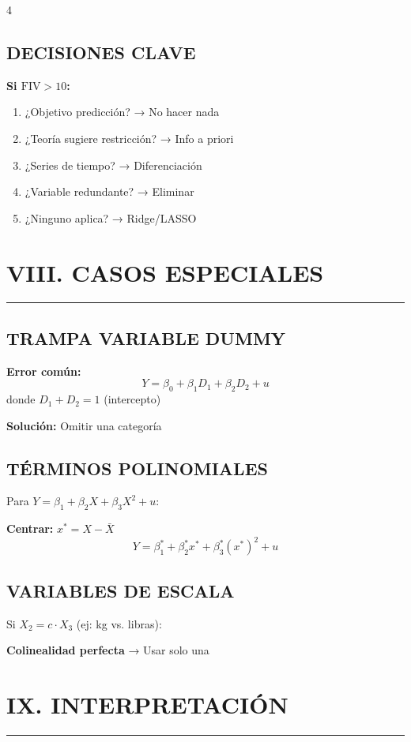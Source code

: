 \documentclass[6pt, landscape]{extarticle}
\newcommand{\sectionline}{%
  \nopagebreak\vspace{-4pt}\noindent\textcolor{GoldLeaf}{\rule{\linewidth}{1pt}}\par\vspace{2pt}%
}
\newcommand{\FIV}{\text{FIV}}
\begin{document}
\begin{multicols*}{4}
\subsection{DECISIONES CLAVE}

\textbf{Si $\FIV > 10$:}
\begin{enumerate}
    \item ¿Objetivo predicción? → No hacer nada
    \item ¿Teoría sugiere restricción? → Info a priori
    \item ¿Series de tiempo? → Diferenciación
    \item ¿Variable redundante? → Eliminar
    \item ¿Ninguno aplica? → Ridge/LASSO
\end{enumerate}


\section{VIII. CASOS ESPECIALES}
\sectionline

\subsection{TRAMPA VARIABLE DUMMY}

\textbf{Error común:}
$$Y = \beta_0 + \beta_1 D_1 + \beta_2 D_2 + u$$
donde $D_1 + D_2 = 1$ (intercepto)

\textbf{Solución:} Omitir una categoría

\subsection{TÉRMINOS POLINOMIALES}

Para $Y = \beta_1 + \beta_2 X + \beta_3 X^2 + u$:

\textbf{Centrar:} $x^* = X - \bar{X}$
$$Y = \beta_1^* + \beta_2^* x^* + \beta_3^* (x^*)^2 + u$$

\subsection{VARIABLES DE ESCALA}

Si $X_2 = c \cdot X_3$ (ej: kg vs. libras):

\textbf{Colinealidad perfecta} → Usar solo una

\section{IX. INTERPRETACIÓN}
\sectionline


\end{multicols*}
\end{document}
